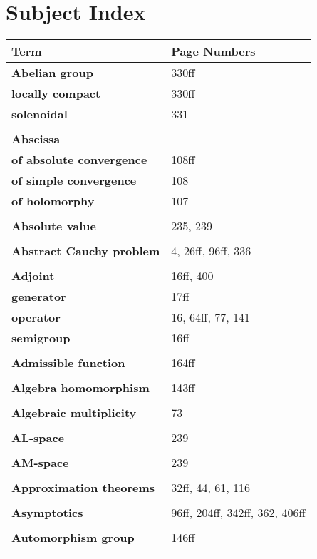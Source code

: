 \documentclass[10pt]{scrartcl}
\begin{document}
\section*{Subject Index}

\begin{longtable}{>{\bfseries}p{6cm}p{8cm}}
\textbf{Term} & \textbf{Page Numbers} \\
\hline
\endhead

\textbf{Abelian group} & 330ff \\
\quad locally compact & 330ff \\
\quad solenoidal & 331 \\
\\
\textbf{Abscissa} & \\
\quad of absolute convergence & 108ff \\
\quad of simple convergence & 108 \\
\quad of holomorphy & 107 \\
\\
\textbf{Absolute value} & 235, 239 \\
\\
\textbf{Abstract Cauchy problem} & 4, 26ff, 96ff, 336 \\
\\
\textbf{Adjoint} & 16ff, 400 \\
\quad generator & 17ff \\
\quad operator & 16, 64ff, 77, 141 \\
\quad semigroup & 16ff \\
\\
\textbf{Admissible function} & 164ff \\
\\
\textbf{Algebra homomorphism} & 143ff \\
\\
\textbf{Algebraic multiplicity} & 73 \\
\\
\textbf{AL-space} & 239 \\
\\
\textbf{AM-space} & 239 \\
\\
\textbf{Approximation theorems} & 32ff, 44, 61, 116 \\
\\
\textbf{Asymptotics} & 96ff, 204ff, 342ff, 362, 406ff \\
\\
\textbf{Automorphism group} & 146ff \\
\\

\end{longtable}
\end{document}
